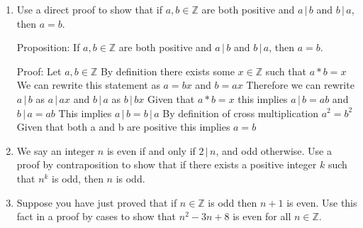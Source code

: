 \documentclass{article}
\newcommand{\bZ}{\mathbb{Z}}
\begin{document}
{\begin{enumerate}[labelindent=0pt,leftmargin=0pt]
\item Use a direct proof to show that if $a,b\in\bZ$ are both positive
and $a\,|\,b$ and $b\,|\,a$, then $a=b$.

Proposition: If $a,b\in\bZ$ are both positive and $a\,|\,b$ and $b\,|\,a$, then $a=b$.

\begin{therom}
Proof: Let $a,b\in\bZ$ 
By definition there exists some $x\in\bZ$ such that $a*b = x$
We can rewrite this statement as $a = bx$ and $b = ax$
Therefore we can rewrite $a\,|\,b$ as  $a\,|\,ax$ and $b\,|\,a$ as $b\,|\,bx$
Given that $a*b = x$ this implies  $a\,|\,b = ab$ and $b\,|\,a =ab$ 
This implies $a\,|\,b = b\,|\,a$
By definition of cross multiplication $a^2 = b^2$
Given that both a and b are positive this implies $a = b$ 
\qedsymbol
\end{therom}

\item We say an integer $n$ is even if and only if $2\,|\,n$, and odd
otherwise. Use a proof by contraposition to show that if there exists a
positive integer $k$ such that $n^k$ is odd, then $n$ is odd.

\item Suppose you have just proved that if $n\in\bZ$ is odd then $n+1$
is even. Use this fact in a proof by cases to show that $n^2-3n+8$ is even
for all $n\in\bZ$.
\end{enumerate}
}
\end{document}
